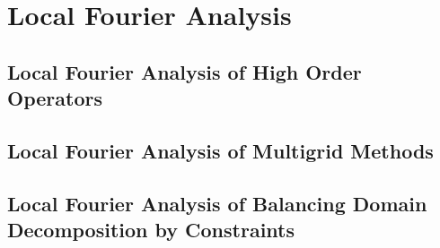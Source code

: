 \chapter{Local Fourier Analysis}\label{03-LocalFourierAnalysis}


\section{Local Fourier Analysis of High Order Operators}\label{03-01-highorder}


\section{Local Fourier Analysis of Multigrid Methods}\label{03-02-multigrid}


\section{Local Fourier Analysis of Balancing Domain Decomposition by Constraints}\label{03-03-bddc}

